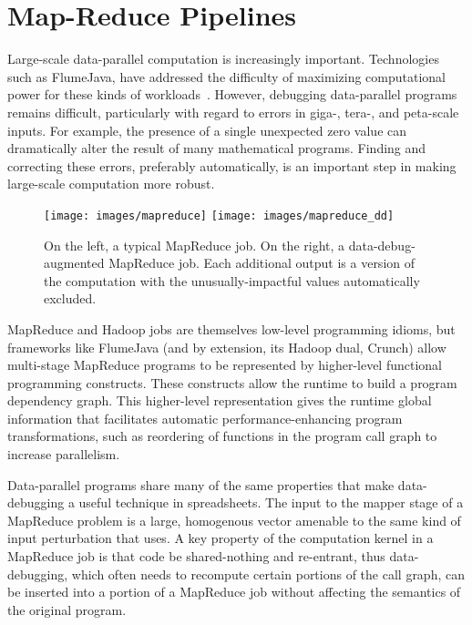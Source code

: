 \section{Map-Reduce Pipelines}
Large-scale data-parallel computation is increasingly important.  Technologies such as FlumeJava, have addressed the difficulty of maximizing computational power for these kinds of workloads~\cite{pldi:flumejava}.  However, debugging data-parallel programs remains difficult, particularly with regard to errors in giga-, tera-, and peta-scale inputs.  For example, the presence of a single unexpected zero value can dramatically alter the result of many mathematical programs.  Finding and correcting these errors, preferably automatically, is an important step in making large-scale computation more robust.

\begin{figure*}[t]
	\texttt{[image: images/mapreduce]}
  \hfill
	\texttt{[image: images/mapreduce\_dd]}
	\caption{
		On the left, a typical MapReduce job.  On the right, a data-debug-augmented MapReduce job.  Each additional output is a version of the computation with the unusually-impactful values automatically excluded.\label{fig:mapreduce_pipeline}
	}
\end{figure*}

MapReduce and Hadoop jobs are themselves low-level programming idioms, but frameworks like FlumeJava (and by extension, its Hadoop dual, Crunch) allow multi-stage MapReduce programs to be represented by higher-level functional programming constructs.  These constructs allow the runtime to build a program dependency graph.  This higher-level representation gives the runtime global information that facilitates automatic performance-enhancing program transformations, such as reordering of functions in the program call graph to increase parallelism.

Data-parallel programs share many of the same properties that make data-debugging a useful technique in spreadsheets.  The input to the mapper stage of a MapReduce problem is a large, homogenous vector amenable to the same kind of input perturbation that \checkcell{} uses.  A key property of the computation kernel in a MapReduce job is that code be shared-nothing and re-entrant, thus data-debugging, which often needs to recompute certain portions of the call graph, can be inserted into a portion of a MapReduce job without affecting the semantics of the original program.

